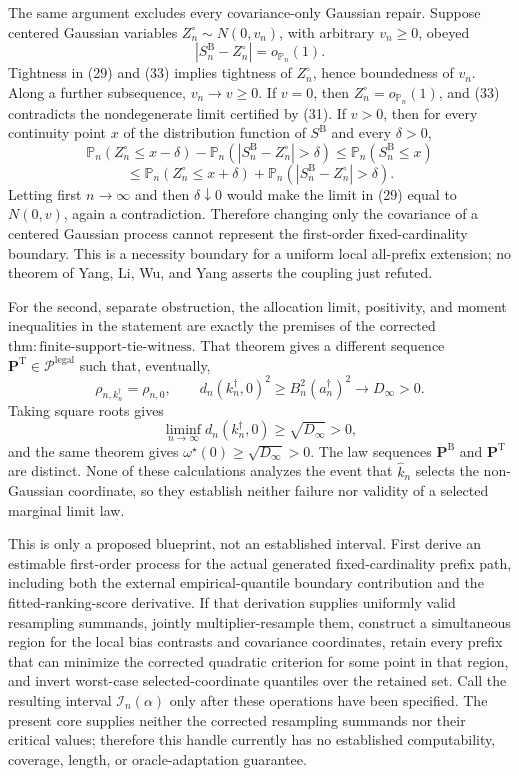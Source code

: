 The same argument excludes every covariance-only Gaussian repair.  Suppose centered Gaussian variables \(Z_n^{\circ}\sim N(0,v_n)\), with arbitrary \(v_n\geq0\), obeyed
\[
 |S_n^{\mathrm B}-Z_n^{\circ}|=o_{\mathbb P_n}(1).
\tag{33}
\]
Tightness in (29) and (33) implies tightness of \(Z_n^{\circ}\), hence boundedness of \(v_n\).  Along a further subsequence, \(v_n\to v\geq0\).  If \(v=0\), then \(Z_n^{\circ}=o_{\mathbb P_n}(1)\), and (33) contradicts the nondegenerate limit certified by (31).  If \(v>0\), then for every continuity point \(x\) of the distribution function of \(S^{\mathrm B}\) and every \(\delta>0\),
\[
 \mathbb P_n(Z_n^{\circ}\leq x-\delta)
 -\mathbb P_n(|S_n^{\mathrm B}-Z_n^{\circ}|>\delta)
 \leq\mathbb P_n(S_n^{\mathrm B}\leq x)
\]
\[
 \leq\mathbb P_n(Z_n^{\circ}\leq x+\delta)
 +\mathbb P_n(|S_n^{\mathrm B}-Z_n^{\circ}|>\delta).
\]
Letting first \(n\to\infty\) and then \(\delta\downarrow0\) would make the limit in (29) equal to \(N(0,v)\), again a contradiction.  Therefore changing only the covariance of a centered Gaussian process cannot represent the first-order fixed-cardinality boundary.  This is a necessity boundary for a uniform local all-prefix extension; no theorem of Yang, Li, Wu, and Yang asserts the coupling just refuted.

For the second, separate obstruction, the allocation limit, positivity, and moment inequalities in the statement are exactly the premises of the corrected \(\mathrm{thm:finite\text{-}support\text{-}tie\text{-}witness}\).  That theorem gives a different sequence \(\mathbf P^{\mathrm T}\in\mathcal P^{\mathrm{legal}}\) such that, eventually,
\[
 \rho_{n,k_n^{\dagger}}=\rho_{n,0},
 \qquad
 d_n(k_n^{\dagger},0)^2
 \geq B_n^2(a_n^{\dagger})^2
 \longrightarrow D_\infty>0.
\]
Taking square roots gives
\[
 \liminf_{n\to\infty}d_n(k_n^{\dagger},0)
 \geq\sqrt{D_\infty}>0,
\]
and the same theorem gives \(\omega^{\star}(0)\geq\sqrt{D_\infty}>0\).  The law sequences \(\mathbf P^{\mathrm B}\) and \(\mathbf P^{\mathrm T}\) are distinct.  None of these calculations analyzes the event that \(\widehat k_n\) selects the non-Gaussian coordinate, so they establish neither failure nor validity of a selected marginal limit law.

This is only a proposed blueprint, not an established interval.  First derive an estimable first-order process for the actual generated fixed-cardinality prefix path, including both the external empirical-quantile boundary contribution and the fitted-ranking-score derivative.  If that derivation supplies uniformly valid resampling summands, jointly multiplier-resample them, construct a simultaneous region for the local bias contrasts and covariance coordinates, retain every prefix that can minimize the corrected quadratic criterion for some point in that region, and invert worst-case selected-coordinate quantiles over the retained set.  Call the resulting interval \(\mathcal I_n(\alpha)\) only after these operations have been specified.  The present core supplies neither the corrected resampling summands nor their critical values; therefore this handle currently has no established computability, coverage, length, or oracle-adaptation guarantee.

